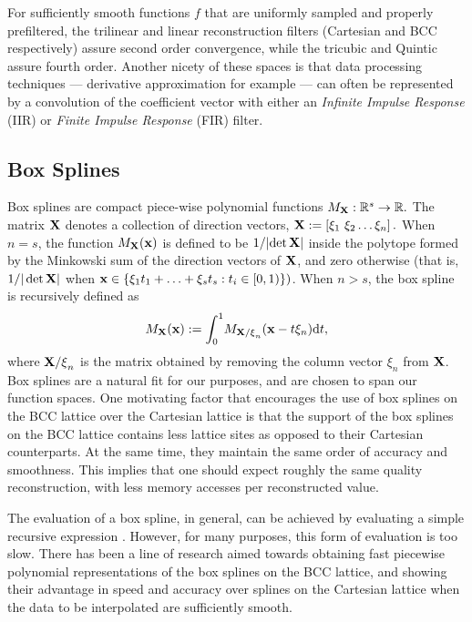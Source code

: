 For sufficiently smooth functions $f$ that are uniformly sampled and properly prefiltered, the trilinear and linear reconstruction filters (Cartesian and BCC respectively) assure second order convergence, while the tricubic and Quintic assure fourth order. Another nicety of these spaces is that data processing techniques --- derivative approximation for example --- can often be represented by a convolution of the coefficient vector with either an \emph{Infinite Impulse Response} (IIR) or \emph{Finite Impulse Response} (FIR) filter. 



\subsection{Box Splines} \label{sec:box_review}
Box splines are compact piece-wise polynomial functions $ M_\mathbf{\mathbf{X}} : \mathbb{R}^s \to \mathbb{R}.$ The matrix $\mathbf{\mathbf{X}}$ denotes a collection of direction vectors, $\mathbf{\mathbf{X}} := \left[ \xi_1 \ \xi_2 \hdots \xi_n\right].$ When $n=s$, the function $M_\mathbf{\mathbf{X}}(\mathbf{x})$ is defined to be ${1}/|{\det\mathbf{\mathbf{X}}}|$ inside the polytope formed by the Minkowski sum of the direction vectors of $\mathbf{\mathbf{X}}$, and zero otherwise (that is, ${1}/{|\det\mathbf{\mathbf{X}}|}$ when $\mathbf{x} \in \{ \mathbf{\xi}_1 t_1 + \hdots + \mathbf{\xi}_s t_s  : t_i\in [0,1) \})$. When $n > s$, the box spline is recursively defined as {\small 
\begin{equation} \label{eq:box_def}
	M_{\mathbf{\Xii}}(\vx) := \int_0^1{\!M_{\mathbf{\Xii/\xi}_n}(\vx - t\mathbf{\xi}_n)} \mathrm{d}t,
\end{equation}}
where ${\mathbf{\mathbf{X}/\xi}_n}$ is the matrix obtained by removing the column vector $\xi_n$ from $\mathbf{\mathbf{X}}$. Box splines are a natural fit for our purposes, and are chosen to span our function spaces. One motivating factor that encourages the use of box splines on the BCC lattice over the Cartesian lattice is that the support of the box splines on the BCC lattice contains less lattice sites as opposed to their Cartesian counterparts. At the same time, they maintain the same order of accuracy and smoothness. This implies that one should expect roughly the same quality reconstruction, with less memory accesses per reconstructed value.

The evaluation of a box spline, in general, can be achieved by evaluating a simple recursive expression \cite{boorboxsplines}. However, for many purposes, this form of evaluation is too slow. There has been a line of research \cite{firstbox} aimed towards obtaining fast piecewise polynomial representations of the box splines on the BCC lattice, and showing their advantage in speed and accuracy over splines on the Cartesian lattice when the data to be interpolated are sufficiently smooth.

